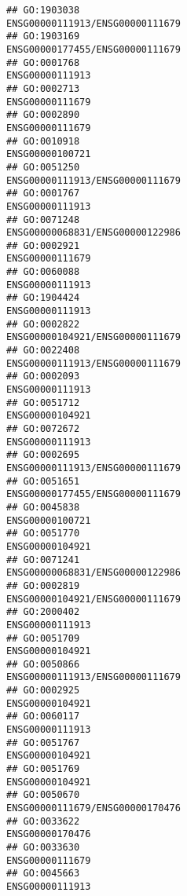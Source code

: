 \documentclass[
]{article}
\begin{document}
\begin{verbatim}
## GO:1903038                                 ENSG00000111913/ENSG00000111679
## GO:1903169                                 ENSG00000177455/ENSG00000111679
## GO:0001768                                                 ENSG00000111913
## GO:0002713                                                 ENSG00000111679
## GO:0002890                                                 ENSG00000111679
## GO:0010918                                                 ENSG00000100721
## GO:0051250                                 ENSG00000111913/ENSG00000111679
## GO:0001767                                                 ENSG00000111913
## GO:0071248                                 ENSG00000068831/ENSG00000122986
## GO:0002921                                                 ENSG00000111679
## GO:0060088                                                 ENSG00000111913
## GO:1904424                                                 ENSG00000111913
## GO:0002822                                 ENSG00000104921/ENSG00000111679
## GO:0022408                                 ENSG00000111913/ENSG00000111679
## GO:0002093                                                 ENSG00000111913
## GO:0051712                                                 ENSG00000104921
## GO:0072672                                                 ENSG00000111913
## GO:0002695                                 ENSG00000111913/ENSG00000111679
## GO:0051651                                 ENSG00000177455/ENSG00000111679
## GO:0045838                                                 ENSG00000100721
## GO:0051770                                                 ENSG00000104921
## GO:0071241                                 ENSG00000068831/ENSG00000122986
## GO:0002819                                 ENSG00000104921/ENSG00000111679
## GO:2000402                                                 ENSG00000111913
## GO:0051709                                                 ENSG00000104921
## GO:0050866                                 ENSG00000111913/ENSG00000111679
## GO:0002925                                                 ENSG00000104921
## GO:0060117                                                 ENSG00000111913
## GO:0051767                                                 ENSG00000104921
## GO:0051769                                                 ENSG00000104921
## GO:0050670                                 ENSG00000111679/ENSG00000170476
## GO:0033622                                                 ENSG00000170476
## GO:0033630                                                 ENSG00000111679
## GO:0045663                                                 ENSG00000111913

\end{verbatim}
\end{document}
